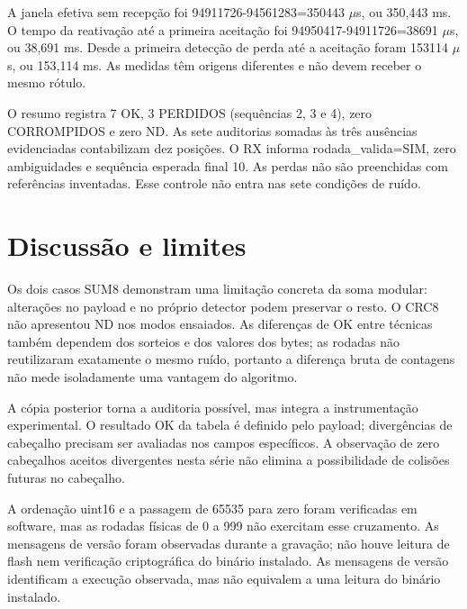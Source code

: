 \documentclass[12pt,a4paper]{article}
\begin{document}
A janela efetiva sem recepção foi 94911726-94561283=350443 \ensuremath{\mu}s, ou 350,443 ms. O tempo da reativação até a primeira aceitação foi 94950417-94911726=38691 \ensuremath{\mu}s, ou 38,691 ms. Desde a primeira detecção de perda até a aceitação foram 153114 \ensuremath{\mu}s, ou 153,114 ms. As medidas têm origens diferentes e não devem receber o mesmo rótulo.\par

O resumo registra 7 OK, 3 PERDIDOS (sequências 2, 3 e 4), zero CORROMPIDOS e zero ND. As sete auditorias somadas às três ausências evidenciadas contabilizam dez posições. O RX informa rodada\_valida=SIM, zero ambiguidades e sequência esperada final 10. As perdas não são preenchidas com referências inventadas. Esse controle não entra nas sete condições de ruído.\par

\section{Discussão e limites}

Os dois casos SUM8 demonstram uma limitação concreta da soma modular: alterações no payload e no próprio detector podem preservar o resto. O CRC8 não apresentou ND nos modos ensaiados. As diferenças de OK entre técnicas também dependem dos sorteios e dos valores dos bytes; as rodadas não reutilizaram exatamente o mesmo ruído, portanto a diferença bruta de contagens não mede isoladamente uma vantagem do algoritmo.\par

A cópia posterior torna a auditoria possível, mas integra a instrumentação experimental. O resultado OK da tabela é definido pelo payload; divergências de cabeçalho precisam ser avaliadas nos campos específicos. A observação de zero cabeçalhos aceitos divergentes nesta série não elimina a possibilidade de colisões futuras no cabeçalho.\par

A ordenação uint16 e a passagem de 65535 para zero foram verificadas em software, mas as rodadas físicas de 0 a 999 não exercitam esse cruzamento. As mensagens de versão foram observadas durante a gravação; não houve leitura de flash nem verificação criptográfica do binário instalado. As mensagens de versão identificam a execução observada, mas não equivalem a uma leitura do binário instalado.\par

\end{document}
